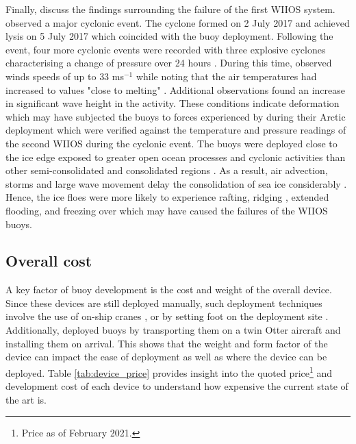 Finally, \textcite{vichi2019effects} discuss the findings surrounding the failure of the first WIIOS system. \textcite{vichi2019effects} observed a major cyclonic event. The cyclone formed on  2 July 2017 and achieved lysis on 5 July 2017 which coincided with the buoy deployment. Following the event, four more cyclonic events were recorded with three explosive cyclones characterising a change of pressure over 24 hours \cite{vichi2019effects}. During this time, \textcite{vichi2019effects} observed winds speeds of up to $33$ ms$^{-1}$ while noting that the air temperatures had increased to values "close to melting" \cite{vichi2019effects}. Additional observations found an increase in significant wave height in the activity. These conditions indicate deformation \cite{vichi2019effects} which may have subjected the buoys to forces experienced by \textcite{doble2017robust} during their Arctic deployment which were verified against the temperature and pressure readings of the second WIIOS during the cyclonic event. The buoys were deployed close to the ice edge exposed to greater open ocean processes and cyclonic activities than other semi-consolidated and consolidated regions \cite{vichi2019effects}. As a result, air advection, storms and large wave movement delay the consolidation of sea ice considerably \cite{vichi2019effects}. Hence, the ice floes were more likely to experience rafting, ridging \cite{icedefinition1992}, extended flooding, and freezing over which may have caused the failures of the WIIOS buoys.

\subsection{Overall cost}
\label{subsec:sec2_overallcost}
A key factor of buoy development is the cost and weight of the overall device. Since these devices are still deployed manually, such deployment techniques involve the use of on-ship cranes \cite{alberello2019drift,kohout2015device}, or by setting foot on the deployment site \cite{planck2019evolution,rabault2019open}. Additionally, \textcite{doble2017robust} deployed buoys by transporting them on a twin Otter aircraft and installing them on arrival. This shows that the weight and form factor of the device can impact the ease of deployment as well as where the device can be deployed. Table \ref{tab:device_price} provides insight into the quoted price\footnote[1]{Price as of February 2021.} and development cost of each device to understand how expensive the current state of the art is.

